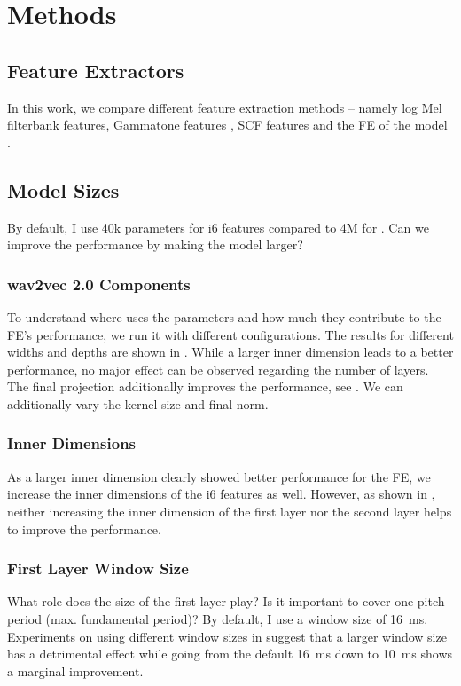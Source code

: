 \documentclass{INTERSPEECH2023}
\begin{document}
\section{Methods}
\subsection{Feature Extractors}
In this work, we compare different feature extraction methods -- namely log Mel filterbank features, Gammatone features \cite{schlueter:icassp07}, \gls{SCF} features \cite{tuske2018:waveform} and the \gls{FE} of the \wvtwo model \cite{facebook2020wav2vec2}.

\subsection{Model Sizes}
By default, I use 40k parameters for i6 features compared to 4M for \wvtwo.
Can we improve the performance by making the model larger?
\subsubsection{wav2vec 2.0 Components}
To understand where \wvtwo uses the parameters and how much they contribute to the \gls{FE}'s performance, we run it with different configurations.
The results for different widths and depths are shown in .
While a larger inner dimension leads to a better performance, no major effect can be observed regarding the number of layers.
The final projection additionally improves the performance, see .
We can additionally vary the kernel size and final norm.

\subsubsection{Inner Dimensions}
As a larger inner dimension clearly showed better performance for the \wvtwo \gls{FE}, we increase the inner dimensions of the i6 features as well.
However, as shown in , neither increasing the inner dimension of the first layer nor the second layer helps to improve the performance.

\subsubsection{First Layer Window Size}
What role does the size of the first layer play? Is it important to cover one pitch period (max. fundamental period)?
By default, I use a window size of \SI{16}{\milli\second}.
Experiments on using different window sizes in  suggest that a larger window size has a detrimental effect while going from the default \SI{16}{\milli\second} down to \SI{10}{\milli\second} shows a marginal improvement.
\end{document}
